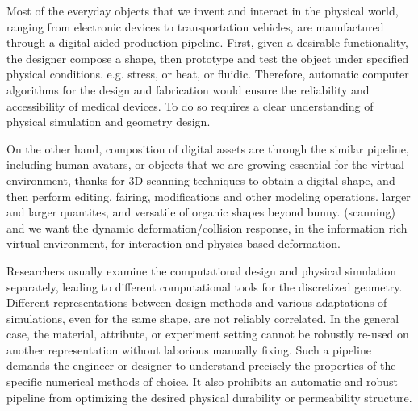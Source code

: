 % 

Most of the everyday objects that we invent and interact in the physical world, ranging from electronic devices to transportation vehicles, are manufactured through a digital aided production pipeline.
First, given a desirable functionality, the designer compose a shape, then prototype and test the object under specified physical conditions. e.g. stress, or heat, or fluidic. 
Therefore, automatic computer algorithms for the design and fabrication would ensure the reliability and accessibility of medical devices. To do so requires a clear understanding of physical simulation and geometry design.

On the other hand, composition of digital assets are through the similar pipeline, including human avatars, or objects that we are growing essential for the  virtual environment, thanks for 3D scanning techniques to obtain a digital shape, and then perform editing, fairing, modifications and other modeling operations. larger and larger quantites, and versatile of organic shapes beyond bunny. (scanning) and we want the dynamic deformation/collision response, in the information rich virtual environment, for interaction and physics based deformation.

Researchers usually examine the computational design and physical simulation separately, leading to different computational tools for the discretized geometry. Different representations between design methods and various adaptations of simulations, even for the same shape, are not reliably correlated. In the general case, the material, attribute, or experiment setting cannot be robustly re-used on another representation without laborious manually fixing. Such a pipeline demands the engineer or designer to understand precisely the properties of the specific numerical methods of choice. It also prohibits an automatic and robust pipeline from optimizing the desired physical durability or permeability structure. 

